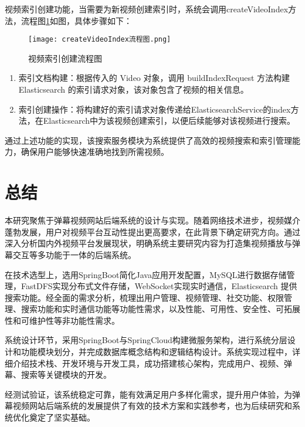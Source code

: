 视频索引创建功能，当需要为新视频创建索引时，系统会调用createVideoIndex方法，流程图\ref{视频索引创建流程图}如图，具体步骤如下：

\begin{figure}[hbt]
    \centering
    \texttt{[image: createVideoIndex流程图.png]}
    \caption{视频索引创建流程图}
    \label{视频索引创建流程图}
\end{figure}

\begin{enumerate}[label=(\arabic*)]
    \item 索引文档构建：根据传入的 Video 对象，调用 buildIndexRequest 方法构建 Elasticsearch 的索引请求对象，该对象包含了视频的相关信息。
    \item 索引创建操作：将构建好的索引请求对象传递给ElasticsearchService的index方法，在Elasticsearch中为该视频创建索引，以便后续能够对该视频进行搜索。
\end{enumerate}

通过上述功能的实现，该搜索服务模块为系统提供了高效的视频搜索和索引管理能力，确保用户能够快速准确地找到所需视频。

\newpage

\section{总结}

本研究聚焦于弹幕视频网站后端系统的设计与实现。随着网络技术进步，视频媒介蓬勃发展，用户对视频平台互动性提出更高要求，在此背景下确定研究方向。通过深入分析国内外视频平台发展现状，明确系统主要研究内容为打造集视频播放与弹幕交互等多功能于一体的后端系统。

在技术选型上，选用SpringBoot简化Java应用开发配置，MySQL进行数据存储管理，FastDFS实现分布式文件存储，WebSocket实现实时通信，Elasticsearch 提供搜索功能。经全面的需求分析，梳理出用户管理、视频管理、社交功能、权限管理、搜索功能和实时通信功能等功能性需求，以及性能、可用性、安全性、可拓展性和可维护性等非功能性需求。

系统设计环节，采用SpringBoot与SpringCloud构建微服务架构，进行系统分层设计和功能模块划分，并完成数据库概念结构和逻辑结构设计。系统实现过程中，详细介绍技术栈、开发环境与开发工具，成功搭建核心架构，完成用户、视频、弹幕、搜索等关键模块的开发。

经测试验证，该系统稳定可靠，能有效满足用户多样化需求，提升用户体验，为弹幕视频网站后端系统的发展提供了有效的技术方案和实践参考，也为后续研究和系统优化奠定了坚实基础。

\newpage

